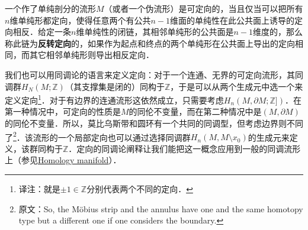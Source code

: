 


一个作了单纯剖分的流形$M$（或者一个伪流形）是可定向的，当且仅当可以把所有$n$维单纯形都定向，使得任意两个有公共$n-1$维面的单纯性在此公共面上诱导的定向相反．给定一条$n$维单纯性的闭链，其相邻单纯形的公共面是$n-1$维度的，那么称此链为\textbf{反转定向}的，如果作为起点和终点的两个单纯形在公共面上导出的定向相同，而其它相邻单纯形则导出相反定向．


我们也可以用同调论的语言来定义定向：对于一个连通、无界的可定向流形，其同调群$H_N(M; \mathbb{Z})$（其支撑集是闭的）同构于$\mathbb{Z}$，于是可以从两个生成元中选一个来定义定向\footnote{译注：就是$\pm 1\in\mathbb{Z}$分别代表两个不同的定向．}．对于有边界的连通流形这依然成立，只需要考虑$H_n(M, \partial M; \mathbb{Z]})$．在第一种情况中，可定向的性质是$M$的同伦不变量，而在第二种情况中是$(M, \partial M)$的同伦不变量．所以，莫比乌斯带和圆环有一个共同的同调型，但考虑边界则不同了\footnote{原文：So, the Möbius strip and the annulus have one and the same homotopy type but a different one if one considers the boundary. }．该流形的一个局部定向也可以通过选择同调群$H_n(M, M\setminus x_0)$的生成元来定义，该群同构于$\mathbb{Z}$．定向的同调论阐释让我们能把这一概念应用到一般的同调流形上（参见\href{https://encyclopediaofmath.org/wiki/Homology_manifold}{Homology manifold}）．

